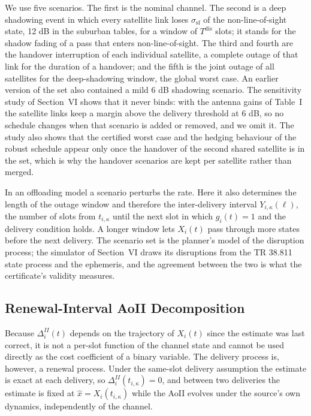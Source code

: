 We use five scenarios. The first is the nominal channel. The second is a deep shadowing event in which every
satellite link loses $\sigma_{\mathrm{sf}}$ of the non-line-of-sight state, 12 dB in the suburban tables, for a window
of $T^{\mathrm{dis}}$ slots; it stands for the shadow fading of a pass that enters non-line-of-sight. The third and
fourth are the handover interruption of each individual satellite, a complete outage of that link for the duration
of a handover; and the fifth is the joint outage of all satellites for the deep-shadowing window, the global worst
case. An earlier version of the set also contained a mild 6 dB shadowing scenario. The sensitivity study of
Section~VI shows that it never binds: with the antenna gains of Table~I the satellite links keep a margin above the
delivery threshold at 6 dB, so no schedule changes when that scenario is added or removed, and we omit it. The study
also shows that the certified worst case and the hedging behaviour of the robust schedule appear only once the
handover of the second shared satellite is in the set, which is why the handover scenarios are kept per satellite
rather than merged.

In an offloading model a scenario perturbs the rate. Here it also determines the length of the outage window and
therefore the inter-delivery interval $Y_{i,\kappa}(\ell)$, the number of slots from $t_{i,\kappa}$ until the next slot
in which $g_i(t)=1$ and the delivery condition holds. A longer window lets $X_i(t)$ pass through more states before
the next delivery. The scenario set is the planner's model of the disruption process; the simulator of Section~VI
draws its disruptions from the TR 38.811 state process and the ephemeris, and the agreement between the two is what
the certificate's validity measures.

\subsection{Renewal-Interval AoII Decomposition}

Because $\Delta_i^{II}(t)$ depends on the trajectory of $X_i(t)$ since the estimate was last correct, it is not a
per-slot function of the channel state and cannot be used directly as the cost coefficient of a binary variable. The
delivery process is, however, a renewal process. Under the same-slot delivery assumption the estimate is exact at each
delivery, so $\Delta_i^{II}(t_{i,\kappa})=0$, and between two deliveries the estimate is fixed at
$\hat{x}=X_i(t_{i,\kappa})$ while the AoII evolves under the source's own dynamics, independently of the channel.

